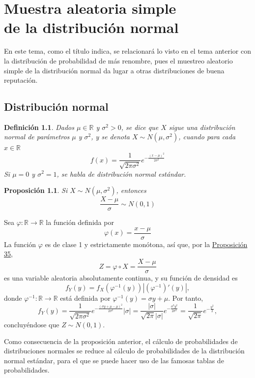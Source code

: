 \documentclass[11pt]{report}
\makeatletter
\renewenvironment{proof}[1][\proofname]{\par
  \pushQED{\qed}%
  \normalfont \topsep\z@skip %
  \trivlist
  \item[\hskip\labelsep
        \itshape
    #1\@addpunct{.}]\ignorespaces
}{%
  \popQED\endtrivlist\@endpefalse
}
\newtheorem{proposition}{Proposición}
\newtheorem{definition}{Definición}
\theoremstyle{definition}
\newcommand{\R}{\mathbb R}
\makeatother
\begin{document}
\chapter[Muestra aleatoria simple de la distribución normal]{Muestra aleatoria simple \\ de la distribución normal}

En este tema, como el título indica, se relacionará lo visto en el tema anterior con la distribución de probabilidad de más renombre, pues el muestreo aleatorio simple de la distribución normal da lugar a otras distribuciones de buena reputación.

\section{Distribución normal}

\begin{definition}
Dados $\mu \in \R$ y $\sigma^2 > 0$, se dice que $X$ sigue una \emph{distribución normal de parámetros $\mu$ y $\sigma^2$}, y se denota $X \sim N(\mu,\sigma^2)$, cuando para cada $x \in \R$
\[f(x) = \frac{1}{\sqrt{2\pi\sigma^2}}e^{-\frac{(x-\mu)^2}{2\sigma^2}}\]
Si $\mu=0$ y $\sigma^2=1$, se habla de \emph{distribución normal estándar}.
\end{definition}

\begin{proposition}
Si $X \sim N(\mu, \sigma^2)$, entonces
\[\frac{X-\mu}{\sigma} \sim N(0,1)\]
\end{proposition}

\begin{proof}
Sea $\varphi \colon \R \to \R$ la función definida por 
\[\varphi(x) = \frac{x-\mu}{\sigma}\]
La función $\varphi$ es de clase 1 y estrictamente monótona, así que, por la \hyperref[propA.16]{\color{blue}Proposición 35},
\[Z=\varphi \circ X=\frac{X-\mu}{\sigma}\]
es una variable aleatoria absolutamente continua, y su función de densidad es
\[f_Y(y)=f_X(\varphi^{-1}(y))|(\varphi^{-1})'(y)|,\]
donde $\varphi^{-1} \colon \R \to \R$ está definida por $\varphi^{-1}(y)=\sigma y +\mu$. Por tanto,
\[f_Y(y)=\frac{1}{\sqrt{2\pi\sigma^2}}e^{-\frac{(\sigma y +\mu-\mu)^2}{2\sigma^2}}|\sigma| = \frac{|\sigma|}{\sqrt{2\pi}|\sigma|}e^{-\frac{\sigma^2y^2}{2\sigma^2}}=\frac{1}{\sqrt{2\pi}}e^{-\frac{y^2}{2}},\]
concluyéndose que $Z \sim N(0,1)$.
\end{proof}

Como consecuencia de la proposición anterior, el cálculo de probabilidades de distribuciones normales se reduce al cálculo de probabilidades de la distribución normal estándar, para el que se puede hacer uso de las famosas tablas de probabilidades.
\end{document}
